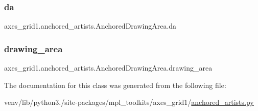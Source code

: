 \subsubsection{\texorpdfstring{da}{da}}
{\footnotesize\ttfamily axes\+\_\+grid1.\+anchored\+\_\+artists.\+Anchored\+Drawing\+Area.\+da}

\mbox{\label{classaxes__grid1_1_1anchored__artists_1_1AnchoredDrawingArea_a269387e8b219d2f5a0788e9276ac275a}} 
\subsubsection{\texorpdfstring{drawing\+\_\+area}{drawing\_area}}
{\footnotesize\ttfamily axes\+\_\+grid1.\+anchored\+\_\+artists.\+Anchored\+Drawing\+Area.\+drawing\+\_\+area}



The documentation for this class was generated from the following file\+:\begin{DoxyCompactItemize}
\item 
venv/lib/python3./site-\/packages/mpl\+\_\+toolkits/axes\+\_\+grid1/\hyperlink{_2anchored__artists_8py}{anchored\+\_\+artists.\+py}\end{DoxyCompactItemize}
